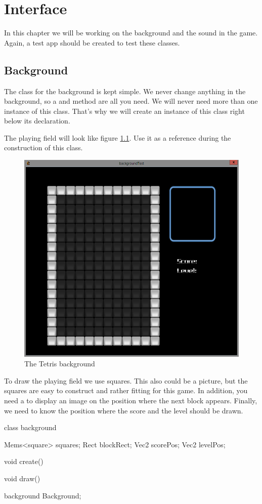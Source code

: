 \chapter{Interface}

In this chapter we will be working on the background and the sound in the game. Again, a test app should be created to test these classes.

\section{Background}
The class for the background is kept simple. We never change anything in the background, so a  and \eeFunc{} method are all you need. We will never need more than one instance of this class. That's why we will create an instance of this class right below its declaration.

The playing field will look like figure \ref{fig:tetris_background}. Use it as a reference during the construction of this class.

\begin{figure}[ht]
\centering
\includegraphics[width=0.6\linewidth]{images/tetris_background.png}
\caption[]{The Tetris background}
\label{fig:tetris_background}
\end{figure}

To draw the playing field we use squares. This also could be a picture, but the squares are easy to construct and rather fitting for this game. In addition, you need a  to display an image on the position where the next block appears. Finally, we need to know the position where the score and the level should be drawn.

\begin{code}
class background
{
   Mems<square> squares;
   Rect blockRect;
   Vec2 scorePos;
   Vec2 levelPos;
   
   void create()
   {
   }
   
   void draw()
   {
   }
}

background Background;
\end{code}

